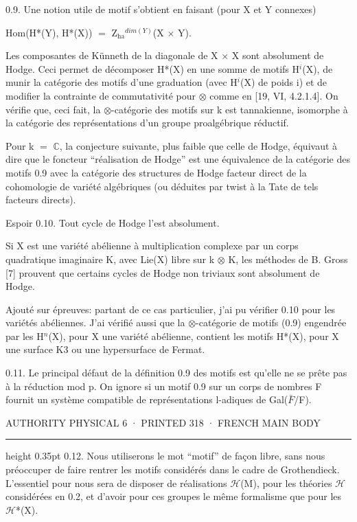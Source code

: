 \documentclass[10pt,twoside]{article}
\newcommand{\PageUnit}[3]{%
  \par\noindent\hypertarget{record-#1}{}%
  \pdfbookmark[1]{Authority page #1 · printed #2}{bookmark-#1}%
  {\sffamily\footnotesize\color{D030Muted}AUTHORITY PHYSICAL #1 · PRINTED #2 · #3}%
  \par\vspace{0.35em}\hrule height 0.35pt\vspace{0.8em}}
\begin{document}
0.9. Une notion utile de motif s’obtient en faisant (pour X et Y connexes)\par
Hom(H*(Y), H*(X)) \ensuremath{=} Z\ensuremath{_{\mathrm{ha}}}\ensuremath{^{dim(Y)}}(X \ensuremath{×} Y).\par
Les composantes de Künneth de la diagonale de X \ensuremath{×} X sont absolument de Hodge. Ceci permet de décomposer H*(X) en une somme de motifs H\ensuremath{^{i}}(X), de munir la catégorie des motifs d’une graduation (avec H\ensuremath{^{i}}(X) de poids i) et de modifier la contrainte de commutativité pour \ensuremath{⊗} comme en [19, VI, 4.2.1.4]. On vérifie que, ceci fait, la \ensuremath{⊗}-catégorie des motifs sur k est tannakienne, isomorphe à la catégorie des représentations d’un groupe proalgébrique réductif.\par
Pour k \ensuremath{=} \ensuremath{ℂ}, la conjecture suivante, plus faible que celle de Hodge, équivaut à dire que le foncteur “réalisation de Hodge” est une équivalence de la catégorie des motifs 0.9 avec la catégorie des structures de Hodge facteur direct de la cohomologie de variété algébriques (ou déduites par twist à la Tate de tels facteurs directs).\par
Espoir 0.10. Tout cycle de Hodge l’est absolument.\par
Si X est une variété abélienne à multiplication complexe par un corps quadratique imaginaire K, avec Lie(X) libre sur k \ensuremath{⊗} K, les méthodes de B. Gross [7] prouvent que certains cycles de Hodge non triviaux sont absolument de Hodge.\par
Ajouté sur épreuves: partant de ce cas particulier, j’ai pu vérifier 0.10 pour les variétés abéliennes. J’ai vérifié aussi que la \ensuremath{⊗}-catégorie de motifs (0.9) engendrée par les H\ensuremath{^{n}}(X), pour X une variété abélienne, contient les motifs H*(X), pour X une surface K3 ou une hypersurface de Fermat.\par
0.11. Le principal défaut de la définition 0.9 des motifs est qu’elle ne se prête pas à la réduction mod p. On ignore si un motif 0.9 sur un corps de nombres F fournit un système compatible de représentations l-adiques de Gal(\ensuremath{\bar{F}}/F).\par
\clearpage
\PageUnit{6}{318}{FRENCH MAIN BODY}
0.12. Nous utiliserons le mot “motif” de façon libre, sans nous préoccuper de faire rentrer les motifs considérés dans le cadre de Grothendieck. L’essentiel pour nous sera de disposer de réalisations \ensuremath{ℋ}(M), pour les théories \ensuremath{ℋ} considérées en 0.2, et d’avoir pour ces groupes le même formalisme que pour les \ensuremath{ℋ}*(X).\par
\end{document}
